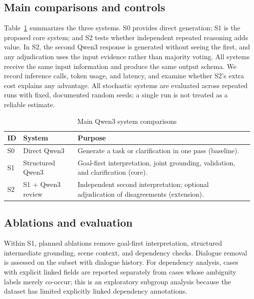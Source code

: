 \documentclass[10pt,conference]{IEEEtran}
\begin{document}
\FloatBarrier
\subsection{Main comparisons and controls}
Table~\ref{tab:systems} summarizes the three systems. S0 provides direct generation; S1 is the proposed core system; and S2 tests whether independent repeated reasoning adds value. In S2, the second Qwen3 response is generated without seeing the first, and any adjudication uses the input evidence rather than majority voting. All systems receive the same input information and produce the same output schema. We record inference calls, token usage, and latency, and examine whether S2's extra cost explains any advantage. All stochastic systems are evaluated across repeated runs with fixed, documented random seeds; a single run is not treated as a reliable estimate.

\begin{table}[!tbp]
\caption{Main Qwen3 system comparisons}
\label{tab:systems}
\centering
\footnotesize
\begin{tabularx}{\columnwidth}{@{}p{}p{}X@{}}
\toprule
\textbf{ID} & \textbf{System} & \textbf{Purpose}\\
\midrule
S0 & Direct Qwen3 & Generate a task or clarification in one pass (baseline).\\
S1 & Structured Qwen3 & Goal-first interpretation, joint grounding, validation, and clarification (core).\\
S2 & S1 + Qwen3 review & Independent second interpretation; optional adjudication of disagreements (extension).\\
\bottomrule
\end{tabularx}
\end{table}

\FloatBarrier
\subsection{Ablations and evaluation}
Within S1, planned ablations remove goal-first interpretation, structured intermediate grounding, scene context, and dependency checks. Dialogue removal is assessed on the subset with dialogue history. For dependency analysis, cases with explicit linked fields are reported separately from cases whose ambiguity labels merely co-occur; this is an exploratory subgroup analysis because the dataset has limited explicitly linked dependency annotations.
\end{document}
